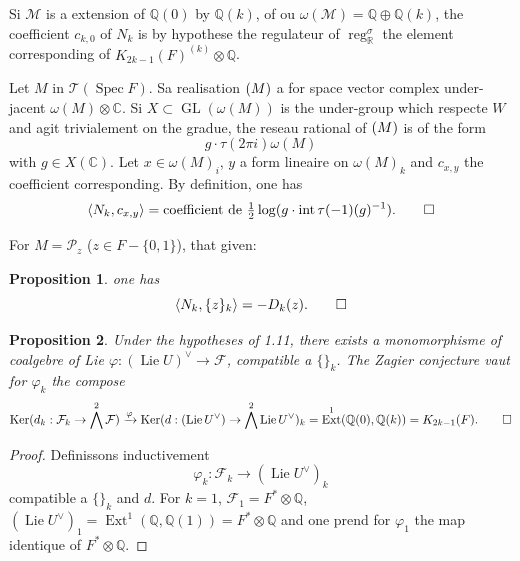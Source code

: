 \documentclass[12pt,a4paper]{article}
\theoremstyle{plain}
\newtheorem{proposition}{Proposition}[section]
\theoremstyle{definition}
\theoremstyle{remark}
\DeclareMathOperator{\Ext}{Ext}
\DeclareMathOperator*{\Ker}{Ker}
\DeclareMathOperator{\reg}{reg}
\DeclareMathOperator{\Spec}{Spec}
\DeclareMathOperator{\Lie}{Lie}
\DeclareMathOperator{\intt}{int}
\newcommand{\Q}{\mathbb{Q}}
\newcommand{\R}{\mathbb{R}}
\newcommand{\C}{\mathbb{C}}
\newcommand{\F}{\mathcal{F}}
\begin{document}
{{Si $\mathcal{M}$ is a extension of $\Q(0)$ by $\Q(k)$, of o{u} $\omega(\mathcal{M})=\Q\oplus\Q(k)$, the coefficient $c_{k,0}$ of $N_k$ is by hypoth{e}se the r{e}gulateur of $\reg_\R^\sigma$ the {e}l{e}ment corresponding of $K_{2k-1}(F)^{(k)}\otimes\Q$.

Let $M$ in $\mathcal{T}(\Spec F)$. Sa r{e}alisation $\real(M)$ a for space vector complex under-jacent $\omega(M)\otimes\C$. Si $X\subset\operatorname{GL}(\omega(M))$ is the under-group which respecte $W$ and agit trivialement on the gradu{e}, the r{e}seau rational of $\real(M)$ is of the form
\begin{equation*}
g\cdot\tau(2\pi i)\omega(M)
\end{equation*}
with $g\in X(\C)$. Let $x\in\omega(M)_i$, $y$ a form lin{e}aire on $\omega(M)_k$ and $c_{x,y}$ the coefficient corresponding. By d{e}finition, one has
\begin{equation*}
\langle N_k,c_{x,y}\rangle = \text{coefficient de }\tfrac{1}{2}\log(g\cdot\intt\tau(-1)(g)^{-1}).\qedhere
\end{equation*}

For $M=\mathcal{P}_z$ ($z\in F-\{0,1\}$), that given:

\begin{proposition}
one has
\begin{equation*}
\langle N_k,\{z\}_k\rangle = -D_k(z).\qedhere
\end{equation*}
\end{proposition}

\begin{proposition}
Under the hypotheses of 1.11, there exists a monomorphisme of coalgebre of Lie $\varphi:(\Lie U)^\vee\to\F$, compatible {a} $\{\}_k$. The Zagier conjecture vaut for $\varphi_k$ the compos{e}
\begin{equation*}
\Ker(d_k:\F_k\to\bigwedge^2\F) \xrightarrow{\varphi} \Ker(d:(\Lie U^\vee)\to\bigwedge^2\Lie U^\vee)_k = \Ext^1(\Q(0),\Q(k)) = K_{2k-1}(F).\qedhere
\end{equation*}
\end{proposition}

\begin{proof}
Definissons inductivement
\begin{equation*}
\varphi_k : \F_k \longrightarrow (\Lie U^\vee)_k
\end{equation*}
compatible {a} $\{\}_k$ and $d$. For $k=1$, $\F_1=F^*\otimes\Q$, $(\Lie U^\vee)_1=\Ext^1(\Q,\Q(1))=F^*\otimes\Q$ and one prend for $\varphi_1$ the map identique of $F^*\otimes\Q$.


\end{proof}}}
\end{document}
